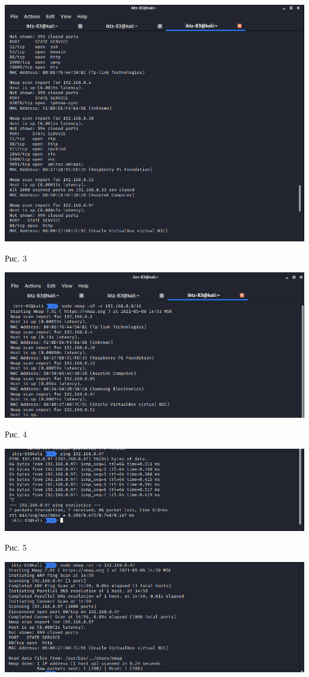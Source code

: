 \documentclass[a4paper,14pt]{extarticle}
\begin{document}
\begin{center}
        \includegraphics[scale=0.5]{pics/2.png}

        Рис. 3

        \includegraphics[scale=0.5]{pics/3.png}

        Рис. 4

        \includegraphics[scale=0.5]{pics/4.png}

        Рис. 5

        \includegraphics[scale=0.5]{pics/5.png}


\end{center}
\end{document}
